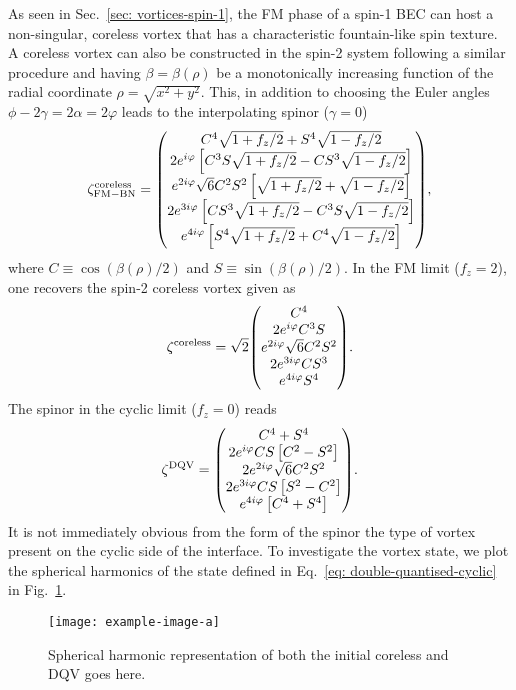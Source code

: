 As seen in Sec.~\ref{sec: vortices-spin-1}, the FM phase of a spin-1 BEC can
host a non-singular, coreless vortex that has a characteristic fountain-like
spin texture.
A coreless vortex can also be constructed in the spin-2 system following a
similar procedure and having \(\beta=\beta(\rho)\) be a monotonically increasing
function of the radial coordinate \(\rho = \sqrt{x^2 + y^2}\).
This, in addition to choosing the Euler angles
\(\phi - 2\gamma = 2\alpha = 2\varphi \) leads to the interpolating spinor
(\(\gamma=0\))
\begin{equation}
    \zeta_\mathrm{FM-BN}^\mathrm{coreless} = \mqty(
    C^4\sqrt{1+f_z/2} + S^4\sqrt{1-f_z/2} \\
    2e^{i\varphi}\left[C^3S\sqrt{1+f_z/2}
        - CS^3\sqrt{1-f_z/2}\right] \\
    e^{2i\varphi}\sqrt{6}C^2S^2\left[\sqrt{1+f_z/2}
        + \sqrt{1-f_z/2} \right] \\
    2e^{3i\varphi}\left[CS^3\sqrt{1+f_z/2}
        - C^3S\sqrt{1-f_z/2}\right] \\
    e^{4i\varphi}\left[S^4\sqrt{1+f_z/2} + C^4\sqrt{1-f_z/2} \right]
    ),
\end{equation}
where \(C \equiv \cos(\beta(\rho)/2)\) and \(S \equiv \sin(\beta(\rho)/2)\).
In the FM limit (\(f_z=2\)), one recovers the spin-2 coreless vortex given as
\begin{equation}
    \zeta^\mathrm{coreless} = \sqrt{2}\mqty(C^4 \\ 2e^{i\varphi}C^3S \\
    e^{2i\varphi}\sqrt{6}C^2S^2 \\ 2e^{3i\varphi}CS^3 \\ e^{4i\varphi}S^4
    ).
\end{equation}
The spinor in the cyclic limit (\(f_z=0\)) reads
\begin{equation}\label{eq: double-quantised-cyclic}
    \zeta^\mathrm{DQV} = \mqty(
    C^4 + S^4 \\
    2e^{i\varphi}CS\left[C^2-S^2\right] \\
    2e^{2i\varphi}\sqrt{6}C^2S^2 \\
    2e^{3i\varphi}CS\left[S^2 - C^2\right] \\
    e^{4i\varphi}\left[C^4 + S^4\right]).
\end{equation}
It is not immediately obvious from the form of the spinor the type of vortex
present on the cyclic side of the interface.
To investigate the vortex state, we plot the spherical harmonics of the state
defined in Eq.~\eqref{eq: double-quantised-cyclic} in
Fig.~\ref{fig: coreless-doubly-quantised}.
\begin{figure}
    \centering
    \texttt{[image: example-image-a]}
    \caption{\label{fig: coreless-doubly-quantised} Spherical harmonic
        representation of both the initial coreless and DQV goes here.}
\end{figure}

